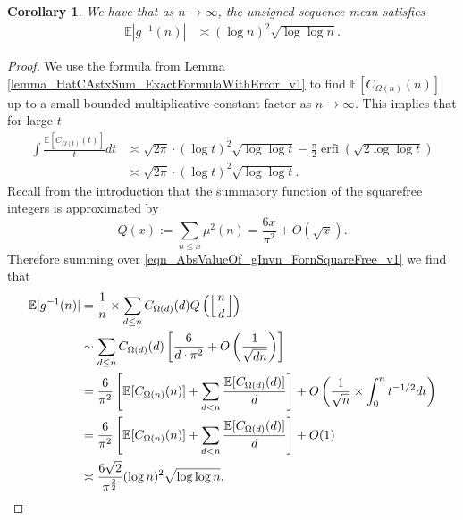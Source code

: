 \documentclass[11pt,reqno,a4letter]{article}
\numberwithin{figure}{section}
\numberwithin{table}{section}
\newcommand{\Floor}[2]{\ensuremath{\left\lfloor \frac{#1}{#2} \right\rfloor}}
\theoremstyle{plain}
\newtheorem{cor}[theorem]{Corollary}
\numberwithin{theorem}{section}
\theoremstyle{definition}
\begin{document}
\begin{cor}
\label{cor_ExpectationFormulaAbsgInvn_v2} 
We have that as $n \rightarrow \infty$, the unsigned sequence mean satisfies 
\begin{align*} 
\mathbb{E}|g^{-1}(n)| & \asymp (\log n)^2 \sqrt{\log\log n}. 
\end{align*} 
\end{cor} 
\begin{proof} 
We use the formula from Lemma \ref{lemma_HatCAstxSum_ExactFormulaWithError_v1} 
to find $\mathbb{E}[C_{\Omega(n)}(n)]$ up to a small bounded multiplicative 
constant factor as $n \rightarrow \infty$.
This implies that for large $t$ 
\begin{align*} 
\int \frac{\mathbb{E}[C_{\Omega(t)}(t)]}{t} dt & \asymp 
     \sqrt{2\pi} \cdot (\log t)^2 \sqrt{\log\log t} - 
     \frac{\pi}{2} \operatorname{erfi}\left(\sqrt{2\log\log t}\right) \\ 
     & \asymp \sqrt{2\pi} \cdot (\log t)^2 \sqrt{\log\log t}. 
\end{align*} 
Recall from the introduction that the summatory function of the 
squarefree integers is approximated by 
\[
Q(x) := \sum_{n \leq x} \mu^2(n) = \frac{6x}{\pi^2} + O(\sqrt{x}). 
\]
Therefore summing over \eqref{eqn_AbsValueOf_gInvn_FornSquareFree_v1} 
we find that  
\begin{align} 
\notag 
\mathbb{E}|g^{-1}(n)| & = \frac{1}{n} \times \sum_{d \leq n} 
     C_{\Omega(d)}(d) Q\left(\Floor{n}{d}\right) \\ 
\notag 
     & \sim \sum_{d \leq n} C_{\Omega(d)}(d) \left[\frac{6}{d \cdot \pi^2} + O\left(\frac{1}{\sqrt{dn}}\right) 
     \right] \\ 
\notag 
     & = \frac{6}{\pi^2} \left[\mathbb{E}[C_{\Omega(n)}(n)] + \sum_{d<n} 
     \frac{\mathbb{E}[C_{\Omega(d)}(d)]}{d}\right] + 
     O\left(\frac{1}{\sqrt{n}} \times \int_0^{n} t^{-1/2} dt\right) \\ 
\label{eqn_proof_tag_ExpAbsgInvn_ExpandedByExpsOfCkn_v1} 
     & = \frac{6}{\pi^2}\left[\mathbb{E}[C_{\Omega(n)}(n)] + 
     \sum_{d<n} \frac{\mathbb{E}[C_{\Omega(d)}(d)]}{d}\right] + O(1) \\ 
\notag 
     & \asymp \frac{6 \sqrt{2}}{\pi^{\frac{3}{2}}} (\log n)^2 \sqrt{\log\log n}. 
     \qedhere 
\end{align} 
\end{proof} 
\end{document}
